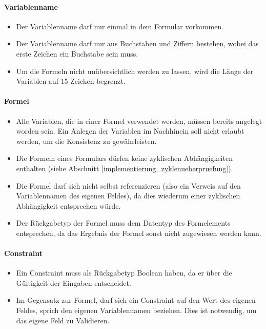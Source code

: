 \paragraph{Variablenname}
\begin{itemize}
	\item Der Variablenname darf nur einmal in dem Formular vorkommen.
	\item Der Variablenname darf nur aus Buchstaben und Ziffern bestehen, wobei das erste Zeichen ein Buchstabe sein muss.
	\item Um die Formeln nicht unübersichtlich werden zu lassen, wird die Länge der Variablen auf 15 Zeichen begrenzt.
\end{itemize}

\paragraph{Formel}
\begin{itemize}
	\item Alle Variablen, die in einer Formel verwendet werden, müssen bereits angelegt worden sein. Ein Anlegen der Variablen im Nachhinein soll nicht erlaubt werden, um die Konsistenz zu gewährleisten.
	\item Die Formeln eines Formulars dürfen keine zyklischen Abhängigkeiten enthalten (siehe Abschnitt \ref{implementierung_zyklenueberpruefung}).
	\item Die Formel darf sich nicht selbst referenzieren (also ein Verweis auf den Variablennamen des eigenen Feldes), da dies wiederum einer zyklischen Abhängigkeit entsprechen würde.
	\item Der Rückgabetyp der Formel muss dem Datentyp des Formelements entsprechen, da das Ergebnis der Formel sonst nicht zugewiesen werden kann.
\end{itemize}

\paragraph{Constraint}
\begin{itemize}
	\item Ein Constraint muss als Rückgabetyp Boolean haben, da er über die Gültigkeit der Eingaben entscheidet.
	\item Im Gegensatz zur Formel, darf sich ein Constraint auf den Wert des eigenen Feldes, sprich den eigenen Variablennamen beziehen. Dies ist not\-wen\-dig, um das eigene Feld zu Validieren.
	
\end{itemize}

